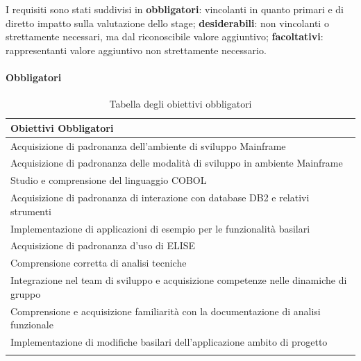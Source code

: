 I requisiti sono stati suddivisi in \textbf{obbligatori}: vincolanti in quanto primari e di diretto impatto sulla valutazione dello stage; \textbf{desiderabili}: non vincolanti o strettamente necessari, ma dal riconoscibile valore aggiuntivo; \textbf{facoltativi}: rappresentanti valore aggiuntivo non strettamente necessario.

	\paragraph{Obbligatori}

		\begin{center}
		  \bgroup
		  \def\arraystretch{1.4}
		   \setlength\arrayrulewidth{0.6pt}
		   \begin{longtable}{ | p{11cm} |} \hline
		    \cellcolor[gray]{0.9} \textbf{Obiettivi Obbligatori} \\ \hline

			 Acquisizione di padronanza dell'ambiente di sviluppo Mainframe  \\ \hline
			 Acquisizione di padronanza delle modalità di sviluppo in ambiente Mainframe \\ \hline
			 Studio e comprensione del linguaggio COBOL\glossario \\ \hline
			 Acquisizione di padronanza di interazione con database DB2 e relativi strumenti \\ \hline
			 Implementazione di applicazioni di esempio per le funzionalità basilari \\ \hline
			 Acquisizione di padronanza d'uso di ELISE \\ \hline
			 Comprensione corretta di analisi tecniche \\ \hline
			 Integrazione nel team di sviluppo e acquisizione competenze nelle dinamiche di gruppo \\ \hline
			 Comprensione e acquisizione familiarità con la documentazione di analisi funzionale \\ \hline
			 Implementazione di modifiche basilari dell'applicazione ambito di progetto \\ \hline
			
			\caption{Tabella degli obiettivi obbligatori}
			
		    \end{longtable}
		  \egroup
		\end{center}
		
